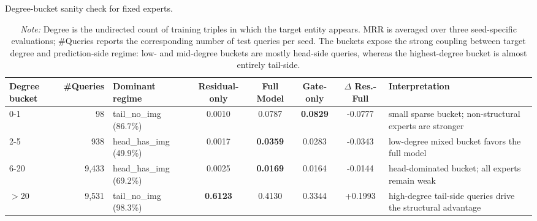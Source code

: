 \begin{table}[t]
\centering
\small
\caption{Degree-bucket sanity check for fixed experts.}
\label{tab:degree_bucket_sanity_check}
\setlength{\tabcolsep}{3pt}
\begin{tabular}{p{}rp{}ccccp{}}
\toprule
Degree bucket & \#Queries & Dominant regime & Residual-only & Full Model & Gate-only & $\Delta$ Res.-Full & Interpretation \\
\midrule
0-1 & 98 & tail\_no\_img (86.7\%) & 0.0010 & 0.0787 & \textbf{0.0829} & -0.0777 & small sparse bucket; non-structural experts are stronger \\
2-5 & 938 & head\_has\_img (49.9\%) & 0.0017 & \textbf{0.0359} & 0.0283 & -0.0343 & low-degree mixed bucket favors the full model \\
6-20 & 9,433 & head\_has\_img (69.2\%) & 0.0025 & \textbf{0.0169} & 0.0164 & -0.0144 & head-dominated bucket; all experts remain weak \\
$>$20 & 9,531 & tail\_no\_img (98.3\%) & \textbf{0.6123} & 0.4130 & 0.3344 & +0.1993 & high-degree tail-side queries drive the structural advantage \\
\bottomrule
\end{tabular}
\vspace{0.4ex}
\caption*{\footnotesize \textit{Note:} Degree is the undirected count of training triples in which the target entity appears. MRR is averaged over three seed-specific evaluations; \#Queries reports the corresponding number of test queries per seed. The buckets expose the strong coupling between target degree and prediction-side regime: low- and mid-degree buckets are mostly head-side queries, whereas the highest-degree bucket is almost entirely tail-side.}
\end{table}
